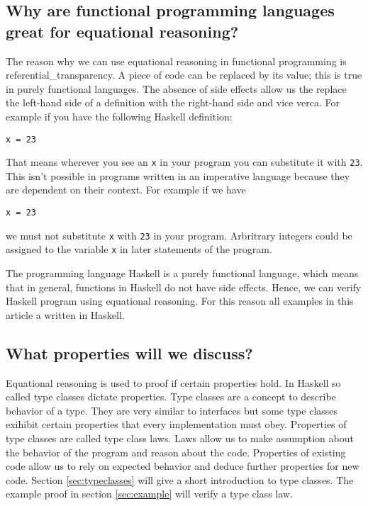 \subsection{Why are functional programming languages great for equational reasoning?}

The reason why we can use equational reasoning in functional programming is \gls{referential_transparency}. A piece of code can be replaced by its value; this is true in purely functional languages. The absence of side effects allow us the replace the left-hand side of a definition with the right-hand side and vice verca. For example if you have the following Haskell definition:
\begin{verbatim}
x = 23
\end{verbatim}
That means wherever you see an \verb|x| in your program you can substitute it with \verb|23|.
This isn't possible in programs written in an imperative language because they are dependent on their context. For example if we have
\begin{verbatim}
x = 23
\end{verbatim}
we must not substitute \verb|x| with \verb|23| in your program. Arbritrary integers could be assigned to the variable \verb|x| in later statements of the program.

The programming language Haskell is a purely functional language, which means that in general, functions in Haskell do not have side effects. Hence, we can verify Haskell program using equational reasoning. For this reason all examples in this article a written in Haskell.

\subsection{What properties will we discuss?}

Equational reasoning is used to proof if certain properties hold. In Haskell so called type classes dictate properties. Type classes are a concept to describe behavior of a type. They are very similar to interfaces but some type classes exihibit certain properties that every implementation must obey. Properties of type classes are called type class laws. Laws allow us to make assumption about the behavior of the program and reason about the code. Properties of existing code allow us to rely on expected behavior and deduce further properties for new code. Section \ref{sec:typeclasses} will give a short introduction to type classes. The example proof in section \ref{sec:example} will verify a type class law.

